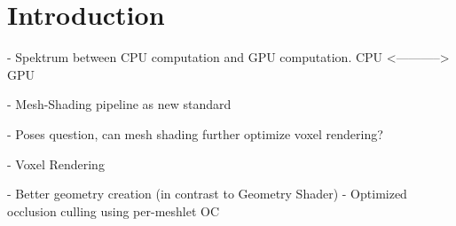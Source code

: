 \chapter{Introduction}

- Spektrum between CPU computation and GPU computation. 
CPU <-----------> GPU

- Mesh-Shading pipeline as new standard 

- Poses question, can mesh shading further optimize voxel rendering?

- Voxel Rendering

- Better geometry creation (in contrast to Geometry Shader)
- Optimized occlusion culling using per-meshlet OC
